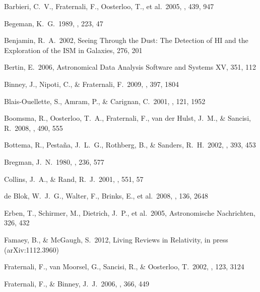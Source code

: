 \documentclass[traditabstract]{aa}
\begin{document}
\begin{thebibliography}{}

 Barbieri, C.~V., Fraternali, F., Oosterloo, T., et al.\ 2005, \aap, 439, 947 

 Begeman, K.~G.\ 1989,
  \aap, 223, 47

 Benjamin, R.~A.\ 2002, Seeing 
Through the Dust: The Detection of HI and the Exploration of the ISM in 
Galaxies, 276, 201 

 Bertin, E.\ 2006, Astronomical 
Data Analysis Software and Systems XV, 351, 112 

 Binney, J., Nipoti, C., 
\& Fraternali, F.\ 2009, \mnras, 397, 1804 

Blais-Ouellette, S., Amram, P., \& Carignan, C.\ 2001, \aj, 121, 1952 

 Boomsma, R., Oosterloo, T.~A., Fraternali, F., van der Hulst, J.~M., \& Sancisi, R.\ 2008, \aap, 490, 555 

 Bottema, R., Pesta{\~n}a, J.~L.~G., Rothberg, B., \& Sanders, R.~H.\ 2002, \aap, 393, 453 

 Bregman, J.~N.\ 1980, \apj, 
236, 577 

 Collins, J.~A., \& Rand, R.~J.\ 2001, \apj, 551, 57 

 de Blok, W.~J.~G., 
Walter, F., Brinks, E., et al.\ 2008, \aj, 136, 2648 

 Erben, T., Schirmer, M., 
Dietrich, J.~P., et al.\ 2005, Astronomische Nachrichten, 326, 432 

 Famaey, B., \& McGaugh, S.\
2012, Living Reviews in Relativity, in press (arXiv:1112.3960)

 Fraternali, F., van 
Moorsel, G., Sancisi, R., \& Oosterloo, T.\ 2002, \aj, 123, 3124 

 Fraternali, F., \& Binney, J.~J.\ 2006, \mnras, 366, 449 


\end{thebibliography}
\end{document}
